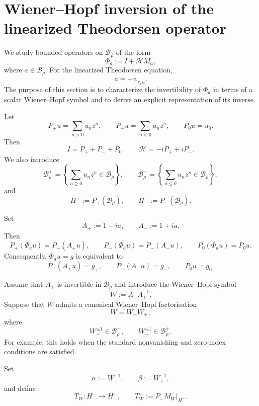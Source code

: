 \documentclass[11pt,a4paper]{amsart}
\begin{document}
\section{Wiener--Hopf inversion of the linearized Theodorsen operator}
\label{sec:WH}

We study bounded operators on $\mathcal B_\rho$ of the form
\begin{equation}\label{eq:Phi_a}
	\Phi_a
	:=
	I+\mathcal H M_a,
\end{equation}
where $a\in\mathcal B_\rho$. For the linearized Theodorsen equation,
\[
a=-\psi_{r,u}.
\]
The purpose of this section is to characterize the invertibility of
$\Phi_a$ in terms of a scalar Wiener--Hopf symbol and to derive an
explicit representation of its inverse.

Let
\[
P_+u=\sum_{n>0}u_nz^n,
\qquad
P_-u=\sum_{n<0}u_nz^n,
\qquad
P_0u=u_0.
\]
Then
\[
I=P_++P_-+P_0,
\qquad
\mathcal H=-iP_++iP_-.
\]
We also introduce
\[
\mathcal B_\rho^+
=
\left\{
\sum_{n\ge0}u_nz^n\in\mathcal B_\rho
\right\},
\qquad
\mathcal B_\rho^-
=
\left\{
\sum_{n\le0}u_nz^n\in\mathcal B_\rho
\right\},
\]
and
\[
H^+:=P_+(\mathcal B_\rho),
\qquad
H^-:=P_-(\mathcal B_\rho).
\]

Set
\begin{equation}\label{eq:Apm}
	A_+:=1-ia,
	\qquad
	A_-:=1+ia.
\end{equation}
Then
\[
P_+(\Phi_a u)=P_+(A_+u),
\qquad
P_-(\Phi_a u)=P_-(A_-u),
\qquad
P_0(\Phi_a u)=P_0u.
\]
Consequently, $\Phi_a u=g$ is equivalent to
\begin{equation}\label{eq:RHsystem}
	P_+(A_+u)=g_+,
	\qquad
	P_-(A_-u)=g_-,
	\qquad
	P_0u=g_0.
\end{equation}

Assume that $A_+$ is invertible in $\mathcal B_\rho$ and introduce
the Wiener--Hopf symbol
\begin{equation}\label{eq:Wsymbol}
	W:=A_-A_+^{-1}.
\end{equation}
Suppose that $W$ admits a canonical Wiener--Hopf factorisation
\begin{equation}\label{eq:WHfactorisation}
	W=W_-W_+,
\end{equation}
where
\[
W_-^{\pm1}\in\mathcal B_\rho^-,
\qquad
W_+^{\pm1}\in\mathcal B_\rho^+.
\]
For example, this holds when the standard nonvanishing and zero-index
conditions are satisfied.

Set
\[
\alpha:=W_-^{-1},
\qquad
\beta:=W_+^{-1},
\]
and define
\[
T_W^-:H^-\longrightarrow H^-,
\qquad
T_W^-:=P_-M_W|_{H^-}.
\]
\end{document}
